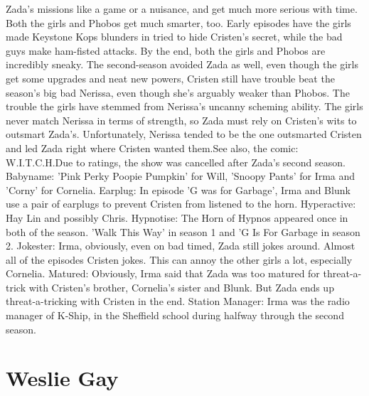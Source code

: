 \documentclass[12pt]{book}
\begin{document}
Zada's missions like a game or a nuisance, and get much more serious with time. Both the girls and Phobos get much smarter, too. Early episodes have the girls made Keystone Kops blunders in tried to hide Cristen's secret, while the bad guys make ham-fisted attacks. By the end, both the girls and Phobos are incredibly sneaky. The second-season avoided Zada as well, even though the girls get some upgrades and neat new powers, Cristen still have trouble beat the season's big bad Nerissa, even though she's arguably weaker than Phobos. The trouble the girls have stemmed from Nerissa's uncanny scheming ability. The girls never match Nerissa in terms of strength, so Zada must rely on Cristen's wits to outsmart Zada's. Unfortunately, Nerissa tended to be the one outsmarted Cristen and led Zada right where Cristen wanted them.See also, the comic: W.I.T.C.H.Due to ratings, the show was cancelled after Zada's second season. Babyname: 'Pink Perky Poopie Pumpkin' for Will, 'Snoopy Pants' for Irma and 'Corny' for Cornelia. Earplug: In episode 'G was for Garbage', Irma and Blunk use a pair of earplugs to prevent Cristen from listened to the horn. Hyperactive: Hay Lin and possibly Chris. Hypnotise: The Horn of Hypnos appeared once in both of the season. 'Walk This Way' in season 1 and 'G Is For Garbage in season 2. Jokester: Irma, obviously, even on bad timed, Zada still jokes around. Almost all of the episodes Cristen jokes. This can annoy the other girls a lot, especially Cornelia. Matured: Obviously, Irma said that Zada was too matured for threat-a-trick with Cristen's brother, Cornelia's sister and Blunk. But Zada ends up threat-a-tricking with Cristen in the end. Station Manager: Irma was the radio manager of K-Ship, in the Sheffield school during halfway through the second season.



\chapter{Weslie Gay}
\end{document}
